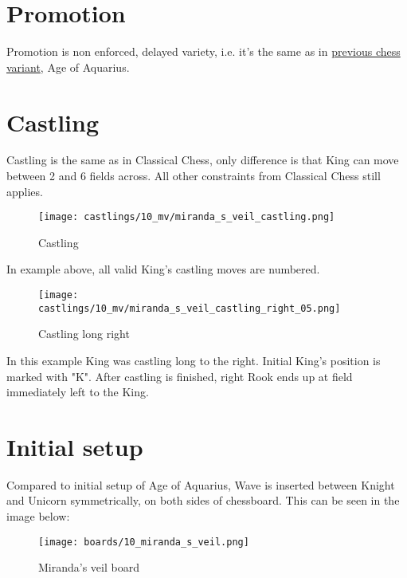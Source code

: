 \vspace*{9.0\baselineskip}
\section*{Promotion}

Promotion is non enforced, delayed variety, i.e. it's the same as in
\hyperref[sec:Age of Aquarius/Promotion]{previous chess variant}, Age of Aquarius.

\clearpage %

\section*{Castling}

Castling is the same as in Classical Chess, only difference is that King can move between 2 and 6 fields across.
All other constraints from Classical Chess still applies.

\noindent
\begin{figure}[!h]
\texttt{[image: castlings/10\_mv/miranda\_s\_veil\_castling.png]}
\caption{Castling}
\label{fig:miranda_s_veil_castling}
\end{figure}

In example above, all valid King's castling moves are numbered.

\noindent
\begin{figure}[!h]
\texttt{[image: castlings/10\_mv/miranda\_s\_veil\_castling\_right\_05.png]}
\caption{Castling long right}
\label{fig:miranda_s_veil_castling_right_05}
\end{figure}

In this example King was castling long to the right. Initial King's position is marked with "K".
After castling is finished, right Rook ends up at field immediately left to the King.

\clearpage %

\section*{Initial setup}

Compared to initial setup of Age of Aquarius, Wave is inserted between Knight and Unicorn
symmetrically, on both sides of chessboard. This can be seen in the image below:

\noindent
\begin{figure}[h]
\texttt{[image: boards/10\_miranda\_s\_veil.png]}
\caption{Miranda's veil board}
\label{fig:10_miranda_s_veil}
\end{figure}

\clearpage %
